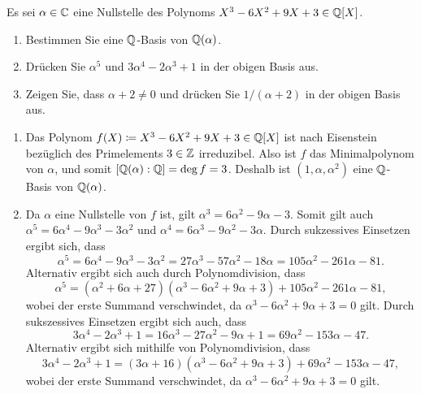 \begin{question}
  Es sei $\alpha \in \mathbb{C}$ eine Nullstelle des Polynoms $X^3 - 6 X^2 + 9 X + 3 \in \mathbb{Q}[X]$.
  \begin{enumerate}
    \item
      Bestimmen Sie eine $\mathbb{Q}$-Basis von $\mathbb{Q}(\alpha)$.
    \item
      Drücken Sie $\alpha^5$ und $3 \alpha^4 - 2 \alpha^3 + 1$ in der obigen Basis aus.
    \item
      Zeigen Sie, dass $\alpha + 2 \neq 0$ und drücken Sie $1/(\alpha + 2)$ in der obigen Basis aus.
  \end{enumerate}
\end{question}


\begin{solution}
  \begin{enumerate}
    \item
      Das Polynom $f(X) \coloneqq X^3 - 6 X^2 + 9 X + 3 \in \mathbb{Q}[X]$ ist nach Eisenstein bezüglich des Primelements $3 \in \mathbb{Z}$ irreduzibel.
      Also ist $f$ das Minimalpolynom von $\alpha$, und somit $[\mathbb{Q}(\alpha) : \mathbb{Q}] = \deg f = 3$.
      Deshalb ist $(1, \alpha, \alpha^2)$ eine $\mathbb{Q}$-Basis von $\mathbb{Q}(\alpha)$.
    
    \item
      Da $\alpha$ eine Nullstelle von $f$ ist, gilt $\alpha^3 = 6 \alpha^2 - 9 \alpha - 3$.
      Somit gilt auch $\alpha^5 = 6 \alpha^4 - 9 \alpha^3 - 3 \alpha^2$ und $\alpha^4 = 6 \alpha^3 - 9 \alpha^2 - 3 \alpha$.
      Durch sukzessives Einsetzen ergibt sich, dass
      \[
          \alpha^5
        = 6 \alpha^4 - 9 \alpha^3 - 3 \alpha^2
        = 27 \alpha^3 - 57 \alpha^2 - 18 \alpha
        = 105 \alpha^2 - 261 \alpha - 81.
      \]
      Alternativ ergibt sich auch durch Polynomdivision, dass
      \[
          \alpha^5
        = (\alpha^2 + 6 \alpha + 27)(\alpha^3 - 6 \alpha^2 + 9 \alpha + 3) + 105 \alpha^2 - 261 \alpha - 81,
      \]
      wobei der erste Summand verschwindet, da $\alpha^3 - 6 \alpha^2 + 9 \alpha + 3 = 0$ gilt.
      Durch sukszessives Einsetzen ergibt sich auch, dass
      \[
          3 \alpha^4 - 2 \alpha^3 + 1
        = 16 \alpha^3 - 27 \alpha^2 - 9 \alpha + 1
        = 69 \alpha^2 - 153 \alpha - 47.
      \]
      Alternativ ergibt sich mithilfe von Polynomdivision, dass
      \[
          3 \alpha^4 - 2 \alpha^3 + 1
        = (3 \alpha + 16)(\alpha^3 - 6 \alpha^2 + 9 \alpha + 3) + 69 \alpha^2 - 153 \alpha - 47,
      \]
      wobei der erste Summand verschwindet, da $\alpha^3 - 6 \alpha^2 + 9 \alpha + 3 = 0$ gilt.
    

\end{enumerate}
\end{solution}
